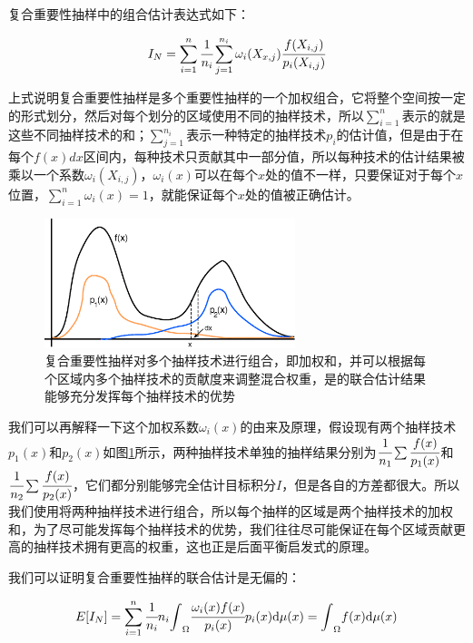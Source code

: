 复合重要性抽样中的组合估计表达式如下：

\begin{equation}\label{e:combined-estimator}
	I_N=\sum_{i=1}^{n} \cfrac{1}{n_i}\sum_{j=1}^{n_i}\omega_i(X_{x,j}) \cfrac{f(X_{i,j})}{p_i(X_{i,j})}
\end{equation}

上式说明复合重要性抽样是多个重要性抽样的一个加权组合，它将整个空间按一定的形式划分，然后对每个划分的区域使用不同的抽样技术，所以$\sum^{n}_{i=1}$表示的就是这些不同抽样技术的和；$\sum^{n_i}_{j=1}$表示一种特定的抽样技术$p_i$的估计值，但是由于在每个$f(x)dx$区间内，每种技术只贡献其中一部分值，所以每种技术的估计结果被乘以一个系数$\omega_i(X_{i,j})$，$\omega_i(x)$可以在每个$x$处的值不一样，只要保证对于每个$x$位置，$\sum^{n}_{i=1}\omega_i(x)=1$，就能保证每个$x$处的值被正确估计。

\begin{figure}
	\sidecaption
	\includegraphics[width=0.65\textwidth]{figures/mc/mis}
	\caption{复合重要性抽样对多个抽样技术进行组合，即加权和，并可以根据每个区域内多个抽样技术的贡献度来调整混合权重，是的联合估计结果能够充分发挥每个抽样技术的优势}
	\label{f:mc-mis-example}
\end{figure}

我们可以再解释一下这个加权系数$\omega_i(x)$的由来及原理，假设现有两个抽样技术$p_1(x)$和$p_2(x)$如图\ref{f:mc-mis-example}所示，两种抽样技术单独的抽样结果分别为$ \cfrac{1}{n_1}\sum \cfrac{f(x)}{p_1(x)}$和$ \cfrac{1}{n_2}\sum \cfrac{f(x)}{p_2(x)}$，它们都分别能够完全估计目标积分$I$，但是各自的方差都很大。所以我们使用将两种抽样技术进行组合，所以每个抽样的区域是两个抽样技术的加权和，为了尽可能发挥每个抽样技术的优势，我们往往尽可能保证在每个区域贡献更高的抽样技术拥有更高的权重，这也正是后面平衡启发式的原理。

我们可以证明复合重要性抽样的联合估计是无偏的：

\begin{equation}
	E[I_N]=\sum_{i=1}^{n} \cfrac{1}{n_i}n_i{\rm \int}_{\Omega} \cfrac{\omega_i(x)f(x)}{p_i(x)}p_i(x){\rm d}\mu (x)={\rm \int}_{\Omega}f(x){\rm d}\mu (x)
\end{equation}

